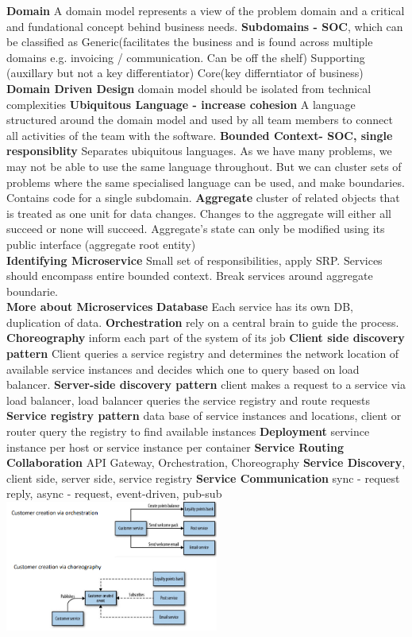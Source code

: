 \documentclass[10pt, landscape]{article}
\begin{document}
\begin{multicols}{4}
\textbf{Domain} A domain model represents a view of the problem domain and a critical and fundational concept behind business needs. \textbf{Subdomains - SOC}, which can be
classified as Generic(facilitates the business and is found across multiple domains e.g. invoicing / communication. Can be off the shelf) Supporting (auxillary but not a key differentiator) Core(key differntiator of business)   \\ 
\textbf{Domain Driven Design} domain model should be isolated from technical complexities
\textbf{Ubiquitous Language - increase cohesion} A language structured around the domain model and used by all team members to connect all activities of the team with the software.
\textbf{Bounded Context- SOC, single responsiblity} Separates ubiquitous languages. As we have many problems, we may not be able to use the same language throughout. But we can cluster sets of problems where the same specialised language can be used, and make boundaries. Contains code for a single subdomain.
\textbf{Aggregate} cluster of related objects that is treated as one unit for data changes. Changes to the aggregate will either all succeed or none will succeed. Aggregate's state can only be modified using its public interface (aggregate root entity) \\

\textbf{Identifying Microservice} 
Small set of responsibilities, apply SRP. Services should encompass entire bounded context. Break services around aggregate boundarie.\\

\textbf{More about Microservices}
\textbf{Database} Each service has its own DB, duplication of data. \textbf{Orchestration} rely on a central brain to guide the process. \textbf{Choreography} inform each part of the system of its job \textbf{Client side discovery pattern} Client queries a service registry and determines the network location of available service instances and decides which one to query based on load balancer. \textbf{Server-side discovery pattern} client makes a request to a service via load balancer, load balancer queries the service registry and route requests \textbf{Service registry pattern} data base of service instances and locations, client or router query the registry to find available instances \textbf{Deployment} servince instance per host or service instance per container \textbf{Service Routing \/ Collaboration} API Gateway, Orchestration, Choreography \textbf{Service Discovery}, client side, server side, service registry \textbf{Service Communication} sync - request reply, async - request, event-driven, pub-sub\\
\includegraphics*[width=7cm]{orchestrate_choreograph.png}



\end{multicols}
\end{document}
